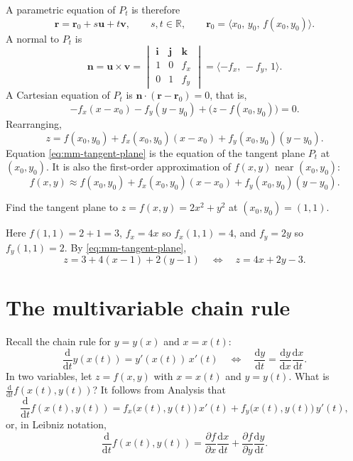A parametric equation of $P_t$ is therefore
\[
 \mathbf r=\mathbf r_0+s\mathbf u+t\mathbf v,\qquad s,t\in\mathbb R,
 \qquad \mathbf r_0=\langle x_0,\,y_0,\,f(x_0,y_0)\rangle.
\]
A normal to $P_t$ is
\[
 \mathbf n=\mathbf u\times\mathbf v=
 \begin{vmatrix}
  \mathbf i&\mathbf j&\mathbf k\\
  1&0&f_x\\
  0&1&f_y
 \end{vmatrix}
 =\langle-f_x,\,-f_y,\,1\rangle.
\]
A Cartesian equation of $P_t$ is $\mathbf n\cdot(\mathbf r-\mathbf r_0)=0$, that is,
\[
 -f_x(x-x_0)-f_y(y-y_0)+\bigl(z-f(x_0,y_0)\bigr)=0.
\]
Rearranging,
\begin{equation}
 \boxed{z=f(x_0,y_0)+f_x(x_0,y_0)(x-x_0)+f_y(x_0,y_0)(y-y_0)}.
 \tag{1}\label{eq:mm-tangent-plane}
\end{equation}
Equation \eqref{eq:mm-tangent-plane} is the equation of the tangent plane
$P_t$ at $(x_0,y_0)$. It is also the first-order approximation of $f(x,y)$
near $(x_0,y_0)$:
\[
 f(x,y)\approx f(x_0,y_0)+f_x(x_0,y_0)(x-x_0)+f_y(x_0,y_0)(y-y_0).
\]

\begin{example}
Find the tangent plane to $z=f(x,y)=2x^2+y^2$ at $(x_0,y_0)=(1,1)$.

Here $f(1,1)=2+1=3$, $f_x=4x$ so $f_x(1,1)=4$, and $f_y=2y$ so $f_y(1,1)=2$.
By \eqref{eq:mm-tangent-plane},
\[
 z=3+4(x-1)+2(y-1)
 \quad\Longleftrightarrow\quad
 \boxed{z=4x+2y-3}.
\]
\end{example}

\section{The multivariable chain rule}

Recall the chain rule for $y=y(x)$ and $x=x(t)$:
\[
 \frac{\mathrm d}{\mathrm dt}y(x(t))=y'(x(t))\,x'(t)
 \quad\Longleftrightarrow\quad
 \frac{\mathrm dy}{\mathrm dt}=\frac{\mathrm dy}{\mathrm dx}\frac{\mathrm dx}{\mathrm dt}.
\]
In two variables, let $z=f(x,y)$ with $x=x(t)$ and $y=y(t)$.
What is $\frac{\mathrm d}{\mathrm dt}f(x(t),y(t))$? It follows from Analysis that
\[
 \frac{\mathrm d}{\mathrm dt}f(x(t),y(t))
 =f_x\bigl(x(t),y(t)\bigr)\,x'(t)+f_y\bigl(x(t),y(t)\bigr)\,y'(t),
\]
or, in Leibniz notation,
\begin{equation}
 \boxed{\frac{\mathrm d}{\mathrm dt}f(x(t),y(t))
 =\frac{\partial f}{\partial x}\frac{\mathrm dx}{\mathrm dt}
 +\frac{\partial f}{\partial y}\frac{\mathrm dy}{\mathrm dt}}.
 \tag{2}\label{eq:mm-chain}
\end{equation}

